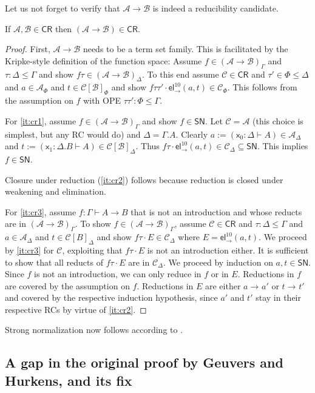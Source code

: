\documentclass[a4paper,USenglish,cleveref, autoref, thm-restate]{lipics-v2021}
\newcommand{\x}{\mathsf{x}}
\newcommand{\tel}{\mathsf{el}}
\newcommand{\el}[2]{\ensuremath{\tel_{#1}^{#2}}}
\newcommand{\red}[1][]{\longrightarrow_{#1}}
\newcommand{\CR}{\mathsf{CR}}
\newcommand{\A}{\mathcal{A}}
\newcommand{\B}{\mathcal{B}}
\newcommand{\C}{\mathcal{C}}
\newcommand{\SN}{\mathsf{SN}}
\begin{document}
Let us not forget to verify that $\A \to \B$ is indeed a reducibility
candidate.
\begin{lemma}
  \label{lem:funcr}
  If $\A,\B \in \CR$ then $(\A \to \B) \in \CR$.
\end{lemma}
\begin{proof}
  First, $\A \to \B$ needs to be a term set family.
  This is facilitated by the Kripke-style definition of the function space:
  Assume $f \in (\A \to \B)_\Gamma$ and $\tau : \Delta \leq \Gamma$
  and show $f \tau \in (\A \to \B)_\Delta$.  To this end assume $\C
  \in \CR$ and $\tau' \in \Phi \leq \Delta$ and $a \in \A_\Phi$ and $t
  \in \C[\B]_\Phi$ and show $f\tau\tau' \cdot \el\to{10}(a,t) \in
  \C_\Phi$.  This follows from the assumption on $f$ with OPE
  $\tau\tau' : \Phi \leq \Gamma$.

  For \ref{it:cr1}, assume $f \in (\A \to \B)_\Gamma$ and show $f \in \SN$.
  Let $\C = \A$ (this choice is simplest, but any RC would do) and
  $\Delta = \Gamma.A$.  Clearly $a := (\x_0 : \Delta \vdash A) \in
  \A_\Delta$ and $t := (\x_1 : \Delta.B \vdash A) \in \C[\B]_\Delta$.
  Thus $f\tau \cdot \el\to{10}(a,t) \in \C_\Delta \subseteq \SN$.
  This implies $f \in \SN$.

  Closure under reduction (\ref{it:cr2}) follows because reduction is
  closed under weakening and elimination.

  For \ref{it:cr3}, assume $f : \Gamma \vdash A \to B$ that is not an
  introduction and whose reducts are in $(\A \to \B)_\Gamma$.  To show
  $f \in (\A \to \B)_\Gamma$, assume $\C \in \CR$ and $\tau : \Delta \leq \Gamma$ and
  $a \in \A_\Delta$ and $t \in \C[B]_\Delta$ and show $f\tau \cdot E \in
  \C_\Delta$ where $E = \el\to{10}(a,t)$.  We proceed by \ref{it:cr3}
  for $\C$, exploiting that $f\tau \cdot E$ is not an introduction
  either.  It is sufficient to show that all reducts of $f\tau \cdot
  E$ are in $\C_\Delta$.  We proceed by induction on $a,t \in \SN$.
  Since $f$ is not an introduction, we can only reduce in $f$ or in $E$.
  Reductions in $f$ are covered by the assumption on $f$.
  Reductions in $E$ are either $a \red a' $ or $t \red t'$ and covered by the
  respective induction hypothesis, since $a'$ and $t'$ stay in their
  respective RCs by virtue of \ref{it:cr2}.
\end{proof}

Strong normalization now follows according to .

\subsection{A gap in the original proof by Geuvers and Hurkens, and its fix}
\label{sec:gap}
\end{document}
